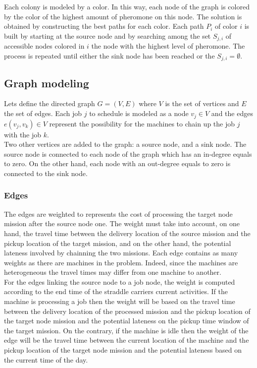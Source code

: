 \documentclass[a4paper,10pt]{article}
\begin{document}
Each colony is modeled by a color. In this way, each node of the graph is colored by the color of the highest amount of pheromone on this node. The solution is obtained by constructing the best paths for each color. Each path $P_i$ of color $i$ is built by starting at the source node and by searching among the set $S_{j,i}$ of accessible nodes colored in $i$ the node with the highest level of pheromone. The process is repeated until either the sink node has been reached or the $S_{j,i} = \emptyset$.

\subsection{Graph modeling}
Lets define the directed graph $G = (V,E)$ where $V$ is the set of vertices and $E$ the set of edges. Each job $j$ to schedule is modeled as a node $v_j \in V$ and the edges $e(v_j,v_k) \in V$ represent the possibility for the machines to chain up the job $j$ with the job $k$.\\

Two other vertices are added to the graph: a source node, and a sink node. The source node is connected to each node of the graph which has an in-degree equals to zero. On the other hand, each node with an out-degree equals to zero is connected to the sink node. %


\subsubsection{Edges}
The edges are weighted to represents the cost of processing the target node mission after the source node one. The weight must take into account, on one hand, the travel time between the delivery location of the source mission and the pickup location of the target mission, and on the other hand, the potential lateness involved by chainning the two missions. Each edge contains as many weights as there are machines in the problem. Indeed, since the machines are heterogeneous the travel times may differ from one machine to another.\\

For the edges linking the source node to a job node, the weight is computed according to the end time of the straddle carriers current activities. If the machine is processing a job then the weight will be based on the travel time between the delivery location of the processed mission and the pickup location of the target node mission and the potential lateness on the pickup time window of the target mission. On the contrary, if the machine is idle then the weight of the edge will be the travel time between the current location of the machine and the pickup location of the target node mission and the potential lateness based on the current time of the day.\\
\end{document}
